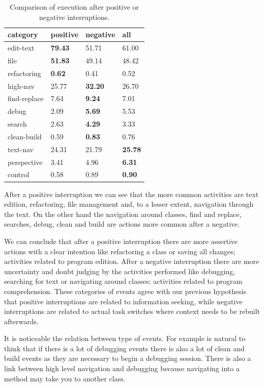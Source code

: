 \documentclass[times]{smrauth}
\begin{document}
\begin{table}[ht!]
\renewcommand{\arraystretch}{1.3}
\caption{Comparison of execution after positive or negative interruptions. }
\label{tbl:stats_events}
\centering
\begin{tabular}{|p{3cm}|p{1cm} |p{1cm}|p{1cm}|} 
  \hline 
category & positive & negative & all \\  
  \hline 
    \hline 
edit-text &  \textbf{79.43} & 51.71 & 61.00 \\
file &  \textbf{51.83} & 49.14 & 48.42\\
refactoring & \textbf{0.62} & 0.41 & 0.52 \\
high-nav & 25.77 & \textbf{32.20} & 26.70  \\
find-replace & 7.64 & \textbf{9.24} & 7.01 \\
debug & 2.09 & \textbf{5.69} & 5.53  \\
search & 2.63 & \textbf{4.29} & 3.33 \\
clean-build & 0.59 & \textbf{0.83} & 0.76  \\
text-nav & 24.31 & 21.79 & \textbf{25.78} \\
perspective & 3.41 & 4.96 & \textbf{6.31}  \\
control & 0.58 & 0.89 & \textbf{0.90} \\
\hline
\end{tabular}
\end{table}

After a positive interruption we can see that the more common activities are text edition, refactoring, file management and, to a lesser extent, navigation through the text. On the other hand the navigation around classes, find and replace, searches, debug, clean and build are actions more common after a negative.

We can conclude that after a positive interruption there are more assertive actions with a clear intention like refactoring a class or saving all changes; activities related to program edition. After a negative interruption there are more uncertainty and doubt judging by the activities performed like debugging, searching for text or navigating around classes; activities related to program comprehension. These categories of events agree with our previous hypothesis that positive interruptions are related to information seeking, while negative interruptions are related to actual task switches where context needs to be rebuilt afterwards.

It is noticeable the relation between type of events. For example is natural to think that if there is a lot of debugging events there is also a lot of clean and build events as they are necessary to begin a debugging session. There is also a link between high level navigation and debugging because navigating into a method may take you to another class.
\end{document}
